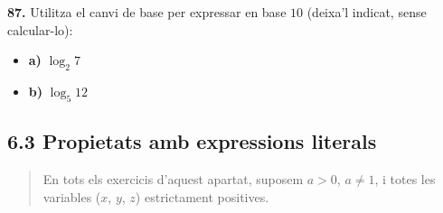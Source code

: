 \documentclass[13pt,a4paper]{extarticle}
\begin{document}
\par\noindent\begin{minipage}{\linewidth}
\textbf{87.} Utilitza el canvi de base per expressar en base $10$ (deixa'l indicat, sense calcular-lo):\par

\begin{itemize}[leftmargin=0pt,itemsep=3pt,topsep=3pt,parsep=0pt,label={}]
\item \textbf{a)} $\log_2 7$
\item \textbf{b)} $\log_5 12$
\end{itemize}
\end{minipage}\par\vspace{1.6mm}
\subsection*{6.3 Propietats amb expressions literals}

\begin{quote}\small En tots els exercicis d'aquest apartat, suposem $a>0$, $a\neq1$, i totes les variables ($x$, $y$, $z$) estrictament positives.\end{quote}
\end{document}

